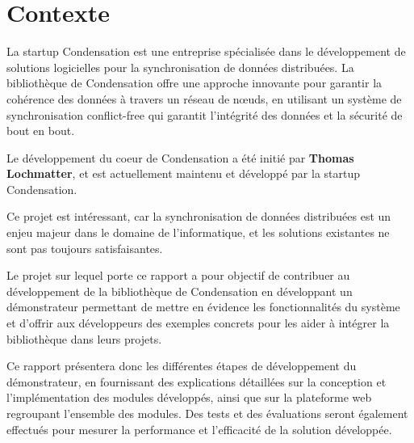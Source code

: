 \section{Contexte}
La startup Condensation est une entreprise spécialisée dans le développement de solutions logicielles pour la synchronisation de données distribuées. La bibliothèque de Condensation offre une approche innovante pour garantir la cohérence des données à travers un réseau de nœuds, en utilisant un système de synchronisation conflict-free qui garantit l'intégrité des données et la sécurité de bout en bout.

Le développement du coeur de Condensation a été initié par \textbf{Thomas Lochmatter}, et est actuellement maintenu et développé par la startup Condensation.

Ce projet est intéressant, car la synchronisation de données distribuées est un enjeu majeur dans le domaine de l'informatique, et les solutions existantes ne sont pas toujours satisfaisantes.

Le projet sur lequel porte ce rapport a pour objectif de contribuer au développement de la bibliothèque de Condensation en développant un démonstrateur permettant de mettre en évidence les fonctionnalités du système et d'offrir aux développeurs des exemples concrets pour les aider à intégrer la bibliothèque dans leurs projets.

Ce rapport présentera donc les différentes étapes de développement du démonstrateur, en fournissant des explications détaillées sur la conception et l'implémentation des modules développés, ainsi que sur la plateforme web regroupant l'ensemble des modules. Des tests et des évaluations seront également effectués pour mesurer la performance et l'efficacité de la solution développée.